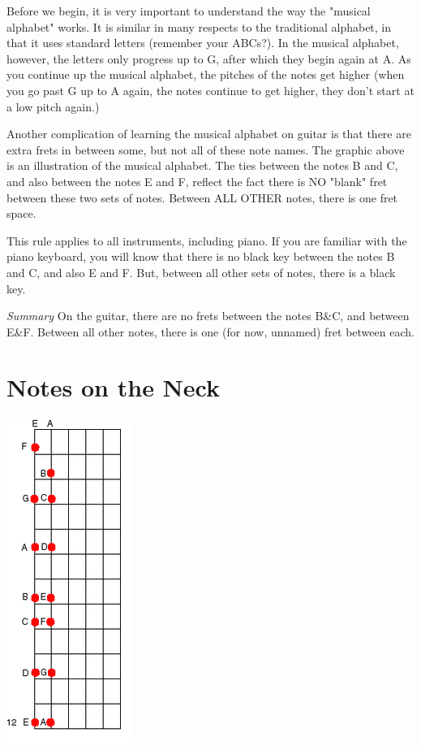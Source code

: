 Before we begin, it is very important to understand the way the "musical
alphabet" works. It is similar in many respects to the traditional alphabet, in
that it uses standard letters (remember your ABCs?). In the musical alphabet,
however, the letters only progress up to G, after which they begin again at A.
As you continue up the musical alphabet, the pitches of the notes get higher
(when you go past G up to A again, the notes continue to get higher, they don't
start at a low pitch again.)

Another complication of learning the musical alphabet on guitar is that there
are extra frets in between some, but not all of these note names. The graphic
above is an illustration of the musical alphabet. The ties between the notes B
and C, and also between the notes E and F, reflect the fact there is NO "blank"
fret between these two sets of notes. Between ALL OTHER notes, there is one
fret space.

This rule applies to all instruments, including piano. If you are familiar with
the piano keyboard, you will know that there is no black key between the notes
B and C, and also E and F. But, between all other sets of notes, there is a
black key.

\emph{Summary} On the guitar, there are no frets between the notes B\&C, and between
E\&F. Between all other notes, there is one (for now, unnamed) fret between
each.

\section{Notes on the Neck}
\includegraphics{partfour/fretboard.png}

